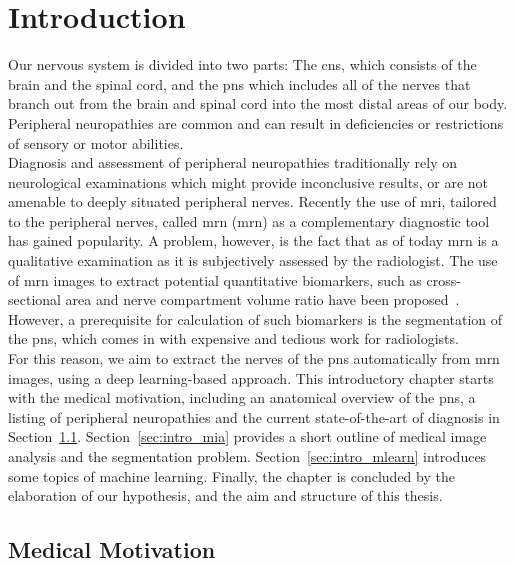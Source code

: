 \chapter{Introduction} %
Our nervous system is divided into two parts: The \gls{cns}, which consists of the brain and the spinal cord, and the \gls{pns} which includes all of the nerves that branch out from the brain and spinal cord into the most distal areas of our body. Peripheral neuropathies are common and can result in deficiencies or restrictions of sensory or motor abilities.\\
Diagnosis and assessment of peripheral neuropathies traditionally rely on neurological examinations which might provide inconclusive results, or are not amenable to deeply situated peripheral nerves. Recently the use of \gls{mri}, tailored to the peripheral nerves, called \acrlong{mrn} (\acrshort{mrn}) as a complementary diagnostic tool has gained popularity. A problem, however, is the fact that as of today \acrshort{mrn} is a qualitative examination as it is subjectively assessed by the radiologist. The use of \acrshort{mrn} images to extract potential quantitative biomarkers, such as cross-sectional area and nerve compartment volume ratio have been proposed~\cite{Kronlage2017,Felisaz2017MRNeuropathy.}. However, a prerequisite for calculation of such biomarkers is the segmentation of the \gls{pns}, which comes in with expensive and tedious work for radiologists.\\
For this reason, we aim to extract the nerves of the \gls{pns} automatically from \acrshort{mrn} images, using a deep learning-based approach. This introductory chapter starts with the medical motivation, including an anatomical overview of the \gls{pns}, a listing of peripheral neuropathies and the current state-of-the-art of diagnosis in Section~\ref{sec:intro_medical}. Section~\ref{sec:intro_mia} provides a short outline of medical image analysis and the segmentation problem. Section~\ref{sec:intro_mlearn} introduces some topics of machine learning. Finally, the chapter is concluded by the elaboration of our hypothesis, and the aim and structure of this thesis.

\section{Medical Motivation} \label{sec:intro_medical} %
